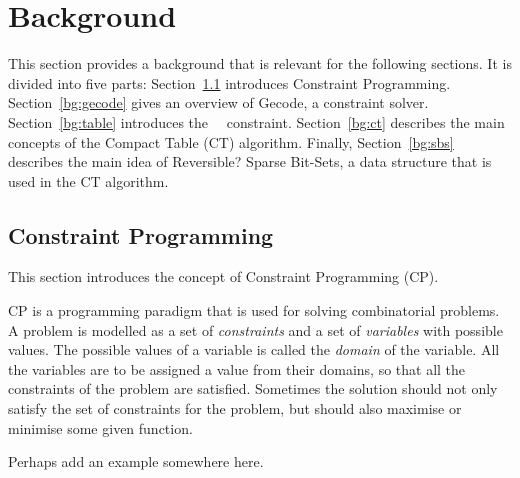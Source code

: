 \documentclass[a4paper,11pt]{article}
\newcommand{\Todo}[1]{{\color{blue}#1}}
\newcommand{\Secref}[1]{Section~\ref{#1}}
\newcommand{\Table}{\Constraint{Table}~}
\numberwithin{equation}{section}
\begin{document}
\section{Background}
\label{bg}


This section provides a background that is relevant for the
following sections. It is divided into five parts: \Secref{bg:cp}
introduces Constraint Programming. \Secref{bg:gecode} gives an overview
of Gecode, a constraint solver. \Secref{bg:table} introduces the~\Table
constraint. \Secref{bg:ct} describes the main concepts of the Compact
Table (CT) algorithm. Finally, \Secref{bg:sbs} describes the main
idea of \Todo{Reversible?} Sparse Bit-Sets,
a data structure that is used in the CT algorithm.

\subsection{Constraint Programming}
\label{bg:cp}
This section introduces the concept of Constraint Programming (CP).

CP is a programming paradigm that is used for solving
combinatorial problems. A problem is
modelled as a set of \emph{constraints} and a
set of \emph{variables} with possible values. The possible values of 
a variable is called the \emph{domain} of the variable.
All the variables are to be assigned a value
from their domains, so that all the constraints of the problem
are satisfied. Sometimes the solution should not only satisfy the set of constraints for the
problem, but should also maximise or minimise some given function.

\Todo{Perhaps add an example somewhere here.}



\end{document}
